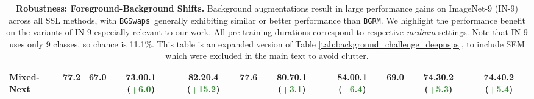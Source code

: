 \documentclass[twoside,11pt]{article}
\newcommand{\bgrm}{\texttt{BG\textunderscore RM}}
\newcommand{\bgswaps}{\texttt{BG\textunderscore Swaps}}
\begin{document}
\begin{table}
{\begin{tabular}{lcccccccccc}
\rowcolor{lightgray}
Mixed-Next  & 77.2 & 67.0 &  73.0{\scriptsize{0.1}} (\textbf{\textcolor{ForestGreen}{+6.0}})  & 82.2{\scriptsize{0.4}} (\textbf{\textcolor{ForestGreen}{+15.2}})  & 77.6  & 80.7{\scriptsize{0.1}} (\textbf{\textcolor{ForestGreen}{+3.1}})   &   84.0{\scriptsize{0.1}} (\textbf{\textcolor{ForestGreen}{+6.4}}) &    69.0 & 74.3{\scriptsize{0.2}} (\textbf{\textcolor{ForestGreen}{+5.3}}) & 74.4{\scriptsize{0.2}} (\textbf{\textcolor{ForestGreen}{+5.4}}) \\ \bottomrule
    \end{tabular}
    }
    \caption{\textbf{Robustness: Foreground-Background Shifts.} Background augmentations result in large performance gains on ImageNet-9 (IN-9) across all SSL methods, with \bgswaps~generally exhibiting similar or better performance than \bgrm. We highlight the performance benefit on the variants of IN-9 especially relevant to our work. All pre-training durations correspond to respective \underline{\textit{medium}} settings. Note that IN-9 uses only 9 classes, so chance is 11.1\%. This table is an expanded version of Table \ref{tab:background_challenge_deepusps}, to include SEM which were excluded in the main text to avoid clutter.}
    \label{tab:background_challenge_deepusps_expand}
\end{table}
\end{document}

